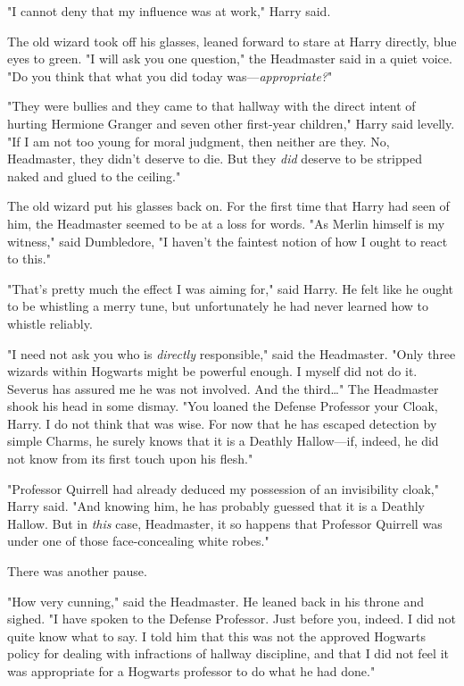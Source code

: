 "I cannot deny that my influence was at work," Harry said.

The old wizard took off his glasses, leaned forward to stare at Harry directly,
blue eyes to green. "I will ask you one question," the Headmaster said in a
quiet voice. "Do you think that what you did today was---\emph{appropriate?}"

"They were bullies and they came to that hallway with the direct intent of
hurting Hermione Granger and seven other first-year children," Harry said
levelly. "If I am not too young for moral judgment, then neither are they. No,
Headmaster, they didn't deserve to die. But they \emph{did} deserve to be
stripped naked and glued to the ceiling."

The old wizard put his glasses back on. For the first time that Harry had seen
of him, the Headmaster seemed to be at a loss for words. "As Merlin himself is
my witness," said Dumbledore, "I haven't the faintest notion of how I ought to
react to this."

"That's pretty much the effect I was aiming for," said Harry. He felt like he
ought to be whistling a merry tune, but unfortunately he had never learned how
to whistle reliably.

"I need not ask you who is \emph{directly} responsible," said the Headmaster.
"Only three wizards within Hogwarts might be powerful enough. I myself did not
do it. Severus has assured me he was not involved. And the third{\ldots}" The
Headmaster shook his head in some dismay. "You loaned the Defense Professor
your Cloak, Harry. I do not think that was wise. For now that he has escaped
detection by simple Charms, he surely knows that it is a Deathly Hallow---if,
indeed, he did not know from its first touch upon his flesh."

"Professor Quirrell had already deduced my possession of an invisibility
cloak," Harry said. "And knowing him, he has probably guessed that it is a
Deathly Hallow. But in \emph{this} case, Headmaster, it so happens that
Professor Quirrell was under one of those face-concealing white robes."

There was another pause.

"How very cunning," said the Headmaster. He leaned back in his throne and
sighed. "I have spoken to the Defense Professor. Just before you, indeed. I did
not quite know what to say. I told him that this was not the approved Hogwarts
policy for dealing with infractions of hallway discipline, and that I did not
feel it was appropriate for a Hogwarts professor to do what he had done."

